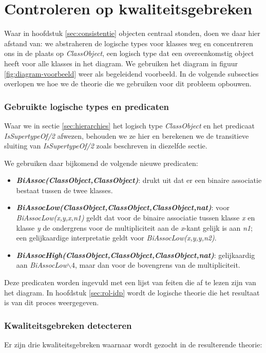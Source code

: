 \chapter{Controleren op kwaliteitsgebreken}\label{sec:kwaliteitsgebrek}
Waar in hoofdstuk \ref{sec:consistentie} objecten centraal stonden, doen we daar hier afstand van: we abstraheren de logische types voor klasses weg en concentreren ons in de plaats op \textit{ClassObject}, een logisch type dat een overeenkomstig object heeft voor alle klasses in het diagram. We gebruiken het diagram in figuur \ref{fig:diagram-voorbeeld} weer als begeleidend voorbeeld. In de volgende subsecties overlopen we hoe we de theorie die we gebruiken voor dit probleem opbouwen.

\subsection{Gebruikte logische types en predicaten}
Waar we in sectie \ref{sec:hierarchies} het logisch type \textit{ClassObject} en het predicaat \textit{IsSupertypeOf/2} afwezen, behouden we ze hier en berekenen we de transitieve sluiting van \textit{IsSupertypeOf/2} zoals beschreven in diezelfde sectie.

We gebruiken daar bijkomend de volgende nieuwe predicaten:

\begin{itemize}
	\item \textbf{\textit{BiAssoc(ClassObject,ClassObject)}}: drukt uit dat er een binaire associatie bestaat tussen de twee klasses.
	\item \textbf{\textit{BiAssocLow(ClassObject,ClassObject,ClassObject,nat)}}: voor \textit{BiAssocLow(x,y,x,n1)} geldt dat voor de binaire associatie tussen klasse \textit{x} en klasse \textit{y} de ondergrens voor de multipliciteit aan de \textit{x}-kant gelijk is aan \textit{n1}; een gelijkaardige interpretatie geldt voor \textit{BiAssocLow(x,y,y,n2)}.
	\item \textbf{\textit{BiAssocHigh(ClassObject,ClassObject,ClassObject,nat)}}: gelijkaardig aan \textit{BiAssocLow$\backslash4$}, maar dan voor de bovengrens van de multipliciteit.
\end{itemize}

Deze predicaten worden ingevuld met een lijst van feiten die af te lezen zijn van het diagram. In hoofdstuk \ref{sec:rol-idp} wordt de logische theorie die het resultaat is van dit proces weergegeven.

\subsection{Kwaliteitsgebreken detecteren}
Er zijn drie kwaliteitsgebreken waarnaar wordt gezocht in de resulterende theorie:

